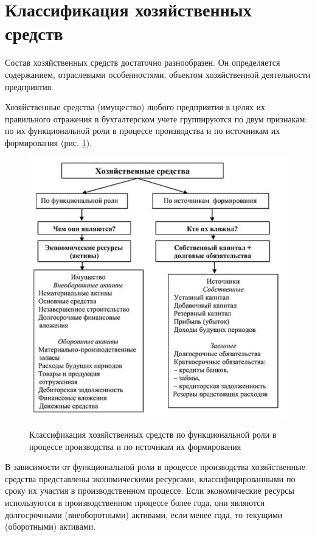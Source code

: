 \documentclass[a4paper,14pt]{extarticle}
\begin{document}
 	\newpage
 	
 	\section{Классификация хозяйственных средств}
 	
 	Состав хозяйственных средств достаточно разнообразен. Он определяется содержанием, отраслевыми особенностями, объектом хозяйственной деятельности предприятия.
 	
 	Хозяйственные средства (имущество) любого предприятия в целях их правильного отражения в бухгалтерском учете группируются по двум признакам: по их функциональной роли в процессе производства и по источникам их формирования (рис. \ref{ris:1}).
 	
 	\begin{figure}[h!]
 		\begin{center}
 			{\includegraphics[scale = 0.4]{1.png}}
 		\end{center}
 		\caption{Классификация хозяйственных средств по функциональной роли в процессе производства и по источнкам их формирования}
 		\label{ris:1}
 	\end{figure}
 
 В зависимости от функциональной роли в процессе производства хозяйственные средства представлены экономическими ресурсами, классифицированными по сроку их участия в производственном процессе. Если экономические ресурсы используются в производственном процессе более года, они являются долгосрочными (внеоборотными) активами, если менее года, то текущими (оборотными) активами.
 
\end{document}
